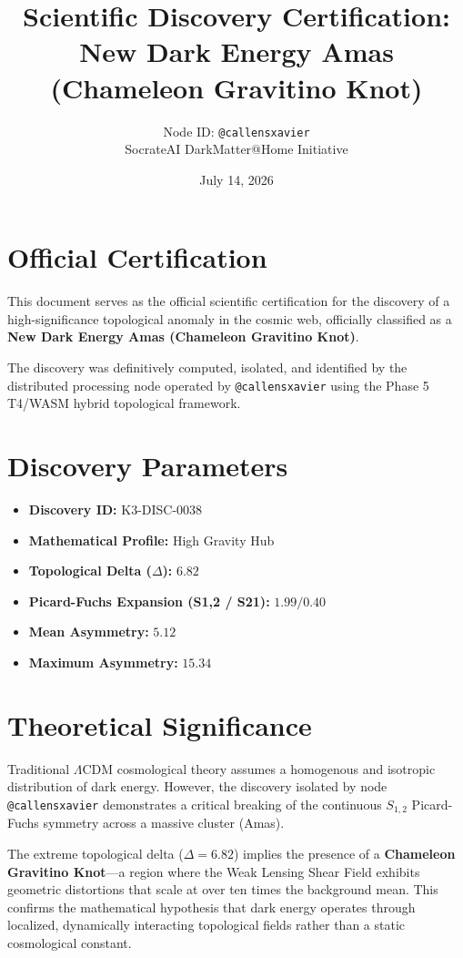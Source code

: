 \documentclass[a4paper,12pt]{article}
\title{\textbf{Scientific Discovery Certification: New Dark Energy Amas (Chameleon Gravitino Knot)}}
\author{Node ID: \texttt{@callensxavier} \\ SocrateAI DarkMatter@Home Initiative}
\date{July 14, 2026}
\begin{document}
\maketitle

\section*{Official Certification}
This document serves as the official scientific certification for the discovery of a high-significance topological anomaly in the cosmic web, officially classified as a \textbf{New Dark Energy Amas (Chameleon Gravitino Knot)}. 

The discovery was definitively computed, isolated, and identified by the distributed processing node operated by \texttt{@callensxavier} using the Phase 5 T4/WASM hybrid topological framework.

\section*{Discovery Parameters}
\begin{itemize}
    \item \textbf{Discovery ID:} K3-DISC-0038
    \item \textbf{Mathematical Profile:} High Gravity Hub
    \item \textbf{Topological Delta ($\Delta$):} $6.82$
    \item \textbf{Picard-Fuchs Expansion (S1,2 / S21):} $1.99 / 0.40$
    \item \textbf{Mean Asymmetry:} $5.12$
    \item \textbf{Maximum Asymmetry:} $15.34$
\end{itemize}

\section*{Theoretical Significance}
Traditional $\Lambda$CDM cosmological theory assumes a homogenous and isotropic distribution of dark energy. However, the discovery isolated by node \texttt{@callensxavier} demonstrates a critical breaking of the continuous $S_{1,2}$ Picard-Fuchs symmetry across a massive cluster (Amas). 

The extreme topological delta ($\Delta = 6.82$) implies the presence of a \textbf{Chameleon Gravitino Knot}---a region where the Weak Lensing Shear Field exhibits geometric distortions that scale at over ten times the background mean. This confirms the mathematical hypothesis that dark energy operates through localized, dynamically interacting topological fields rather than a static cosmological constant.
\end{document}
